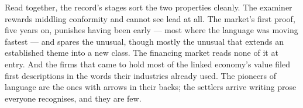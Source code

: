 Read together, the record's stages sort the two properties cleanly. The
examiner rewards middling conformity and cannot see lead at all. The
market's first proof, five years on, punishes having been early --- most
where the language was moving fastest --- and spares the unusual, though
mostly the unusual that extends an established theme into a new class.
The financing market reads none of it at entry. And the firms that came
to hold most of the linked economy's value filed first descriptions in
the words their industries already used. The pioneers of language are the
ones with arrows in their backs; the settlers arrive writing prose
everyone recognises, and they are few.

